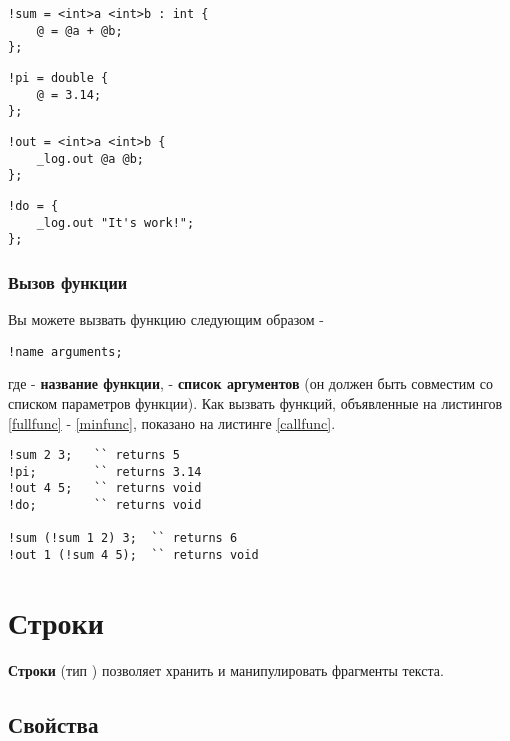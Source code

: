 \documentclass[a4paper, 14pt]{extarticle}
\begin{document}
\begin{lstlisting}[caption=Полноценная функция, label=fullfunc]
!sum = <int>a <int>b : int {
	@ = @a + @b;
};
\end{lstlisting}

\begin{lstlisting}[caption=Функция без аргументов, label=noargsfunc]
!pi = double {
	@ = 3.14;
};
\end{lstlisting}

\begin{lstlisting}[caption=Функция без типа возвращаемой значений, label=notypefunc]
!out = <int>a <int>b {
	_log.out @a @b;
};
\end{lstlisting}

\begin{lstlisting}[caption=Функция без аргументов и тип возвращаемой значений, label=minfunc]
!do = {
	_log.out "It's work!";
};
\end{lstlisting}

\subsubsection{Вызов функции}

Вы можете вызвать функцию следующим образом -
\begin{lstlisting}[numbers=none]
!name arguments;
\end{lstlisting}
где  - {\bf название функции},  - {\bf список аргументов} (он должен быть совместим со списком параметров функции). Как вызвать функций, объявленные на листингов \ref{fullfunc} - \ref{minfunc}, показано на листинге \ref{callfunc}.


\begin{lstlisting}[caption=Вызов функций, label=callfunc]
!sum 2 3; 	`` returns 5
!pi; 		`` returns 3.14
!out 4 5; 	`` returns void
!do; 		`` returns void

!sum (!sum 1 2) 3;	`` returns 6
!out 1 (!sum 4 5);	`` returns void
\end{lstlisting}

\section{Строки}

{\bf Строки} (тип \str{}) позволяет хранить и манипулировать фрагменты текста. 

\subsection{Свойства}
\end{document}
